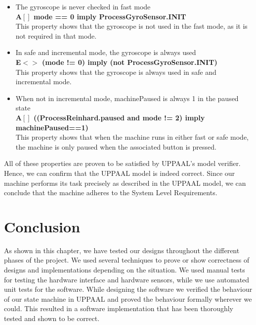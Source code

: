 \documentclass[a4paper,oneside,11pt]{article}
\begin{document}
\begin{itemize}
	\item The gyroscope is never checked in fast mode\\
		\textbf{A$[]$ mode == 0 imply ProcessGyroSensor.INIT}\\
		This property shows that the gyroscope is not used in the fast mode, as it is not required in that mode. 

	\item In safe and incremental mode, the gyroscope is always used\\
		\textbf{E$<>$ (mode != 0) imply (not ProcessGyroSensor.INIT)}\\
		This property shows that the gyroscope is always used in safe and incremental mode. 

	\item When not in incremental mode, machinePaused is always 1 in the paused state\\
		\textbf{A$[]$ ((ProcessReinhard.paused and mode != 2) imply machinePaused==1)}\\
		This property shows that when the machine runs in either fast or safe mode, the machine is only paused when the associated button is pressed.
\end{itemize}

All of these properties are proven to be satisfied by UPPAAL’s model verifier. Hence, we can confirm that the UPPAAL model is indeed correct. Since our machine performs its task precisely as described in the UPPAAL model, we can conclude that the machine adheres to the System Level Requirements.

\section{Conclusion}
As shown in this chapter, we have tested our designs throughout the different phases of the project. We used several techniques to prove or show correctness of designs and implementations depending on the situation. We used manual tests for testing the hardware interface and hardware sensors, while we use automated unit tests for the software. While designing the software we verified the behaviour of our state machine in UPPAAL and proved the behaviour formally wherever we could. This resulted in a software implementation that has been thoroughly tested and shown to be correct.
\end{document}
